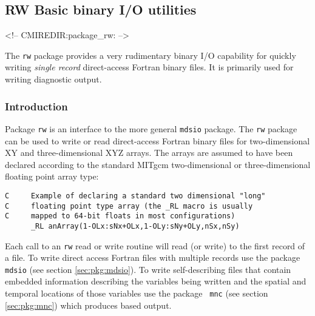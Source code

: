 \subsection{RW Basic binary I/O utilities}
\label{sec:pkg:rw}
\begin{rawhtml}
<!-- CMIREDIR:package_rw: -->
\end{rawhtml}

The {\tt rw} package provides a very rudimentary binary I/O capability
for quickly writing {\it single record} direct-access Fortran binary files.
It is primarily used for writing diagnostic output.

\subsubsection{Introduction}
Package {\tt rw} is an interface to the more general {\tt mdsio} package.
The {\tt rw} package can be used to write or read direct-access Fortran
binary files for two-dimensional XY and three-dimensional XYZ arrays.
The arrays are assumed to have been declared according to the standard
MITgcm two-dimensional or three-dimensional floating point array type:
\begin{verbatim}
C     Example of declaring a standard two dimensional "long"
C     floating point type array (the _RL macro is usually
C     mapped to 64-bit floats in most configurations)
      _RL anArray(1-OLx:sNx+OLx,1-OLy:sNy+OLy,nSx,nSy)
\end{verbatim}

Each call to an {\tt rw} read or write routine will read (or write) to
the first record of a file. To write direct access Fortran files with
multiple records use the package {\tt mdsio} (see section
\ref{sec:pkg:mdsio}).  To write self-describing files that contain
embedded information describing the variables being written and the
spatial and temporal locations of those variables use the package {\tt
  mnc} (see section \ref{sec:pkg:mnc}) which produces
\cite{rew:97} based output.


